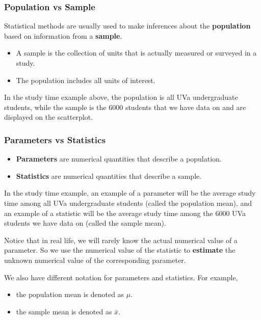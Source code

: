 \documentclass[
]{book}
\providecommand{\tightlist}{%
  \setlength{\itemsep}{0pt}\setlength{\parskip}{0pt}}
\begin{document}
\subsubsection{Population vs Sample}\label{population-vs-sample}

Statistical methods are usually used to make inferences about the \textbf{population} based on information from a \textbf{sample}.

\begin{itemize}
\tightlist
\item
  A sample is the collection of units that is actually measured or surveyed in a study.
\item
  The population includes all units of interest.
\end{itemize}

In the study time example above, the population is all UVa undergraduate students, while the sample is the 6000 students that we have data on and are displayed on the scatterplot.

\subsubsection{Parameters vs Statistics}\label{parameters-vs-statistics}

\begin{itemize}
\tightlist
\item
  \textbf{Parameters} are numerical quantities that describe a population.
\item
  \textbf{Statistics} are numerical quantities that describe a sample.
\end{itemize}

In the study time example, an example of a parameter will be the average study time among all UVa undergraduate students (called the population mean), and an example of a statistic will be the average study time among the 6000 UVa students we have data on (called the sample mean).

Notice that in real life, we will rarely know the actual numerical value of a parameter. So we use the numerical value of the statistic to \textbf{estimate} the unknown numerical value of the corresponding parameter.

We also have different notation for parameters and statistics. For example,

\begin{itemize}
\tightlist
\item
  the population mean is denoted as \(\mu\).
\item
  the sample mean is denoted as \(\bar{x}\).
\end{itemize}
\end{document}

